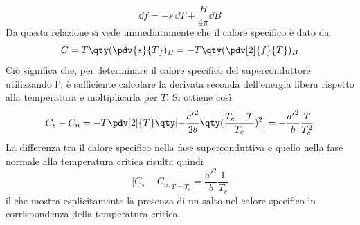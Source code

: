 \begin{equation*}
   \dd{f}
   = -s\,\dd{T} + \frac{H}{4\pi} \dd{B}
\end{equation*}
Da questa relazione si vede immediatamente che il calore specifico è dato da
\begin{equation*}
   C
   =T\qty(\pdv{s}{T})_B
   =-T\qty(\pdv[2]{f}{T})_B
\end{equation*}
Ciò significa che, per determinare il calore specifico del superconduttore utilizzando l', è sufficiente calcolare la derivata seconda dell'energia libera rispetto alla temperatura e moltiplicarla per $T$. Si ottiene così
\begin{equation*}
   C_s - C_n
   =- T \pdv[2]{T}
   \qty[ -\frac{{a'}^2}{2b} \qty(\frac{T_c-T}{T_c})^2 ]
   =- \frac{{a'}^2}{b}\frac{T}{T_c^2}
\end{equation*}
La differenza tra il calore specifico nella fase superconduttiva e quello nella fase normale alla temperatura critica risulta quindi
\begin{equation*}
   \bigl[ C_s - C_n \bigr]_{T=T_c}
   =\frac{{a'}^2}{b}\frac{1}{T_c}
\end{equation*}
il che mostra esplicitamente la presenza di un salto nel calore specifico in corrispondenza della temperatura critica.

